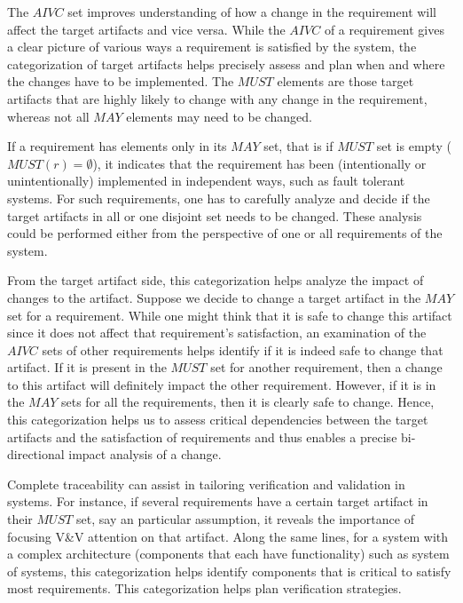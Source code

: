 The $AIVC$ set improves understanding of how a change in the requirement will affect the target artifacts and vice versa. While the $AIVC$ of a requirement gives a clear picture of various ways a requirement is satisfied by the system, the categorization of target artifacts helps precisely assess and plan when and where the changes have to be implemented. The $MUST$ elements are those target artifacts that are highly likely to change with any change in the requirement, whereas not all $MAY$ elements may need to be changed.

If a requirement has elements only in its $MAY$ set, that is if $MUST$ set is empty
($MUST(r) = \emptyset$), it indicates that the requirement has been (intentionally or unintentionally) implemented in independent ways, such as fault tolerant systems. For such requirements, one has to carefully analyze and decide if the target artifacts in all or one disjoint set needs to be changed. These analysis could be performed either from the perspective of one or all requirements of the system.

From the target artifact side, this categorization helps analyze the impact of changes to the artifact. Suppose we decide to change a target artifact in the $MAY$ set for a requirement. While one might think that it is safe to change this artifact since it does not affect that requirement's satisfaction, an examination of the $AIVC$ sets of other requirements helps identify if it is indeed safe to change that artifact. If it is present in the $MUST$ set for another requirement, then a change to this artifact will definitely impact the other requirement. However, if it is in the $MAY$ sets for all the requirements, then it is clearly safe to change. Hence, this categorization helps us to assess critical dependencies between the target artifacts and the satisfaction of requirements and thus enables a precise bi-directional impact analysis of a change.

Complete traceability can assist in tailoring verification and validation in systems. For instance, if several requirements have a certain target artifact in their $MUST$ set, say an particular assumption, it reveals the importance of focusing V\&V attention on that artifact. Along the same lines, for a system with a complex architecture (components that each have functionality) such as  system of systems, this categorization helps identify components that is critical to satisfy most requirements. This categorization helps plan verification strategies.

